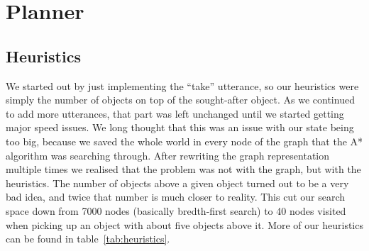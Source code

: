 \section*{Planner}

\subsection*{Heuristics}
We started out by just implementing the ``take'' utterance, so our heuristics
were simply the number of objects on top of the sought-after object. As we
continued to add more utterances, that part was left unchanged until we started
getting major speed issues. We long thought that this was an issue with our
state being too big, because we saved the whole world in every node of the
graph that the A* algorithm was searching through. After rewriting the graph
representation multiple times we realised that the problem was not with the
graph, but with the heuristics. The number of objects above a given object
turned out to be a very bad idea, and twice that number is much closer to
reality. This cut our search space down from 7000 nodes (basically bredth-first
search) to 40 nodes visited when picking up an object with about five objects
above it. More of our heuristics can be found in table~\ref{tab:heuristics}.

